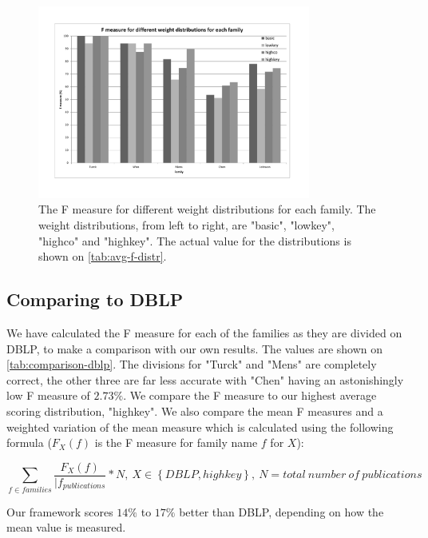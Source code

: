 \begin{figure}[htb]
	\centering
		\includegraphics[width=0.80\textwidth]{./fig/test-weights.pdf}
	\caption{The F measure for different weight distributions for each family. The weight distributions, from left to right, are "basic", "lowkey", "highco" and "highkey". The actual value for the distributions is shown on \autoref{tab:avg-f-distr}.}
	\label{fig:test-weights}
\end{figure}

\subsection{Comparing to DBLP}

We have calculated the F measure for each of the families as they are divided on DBLP, to make a comparison with our own results. The values are shown on \autoref{tab:comparison-dblp}. The divisions for "Turck" and "Mens" are completely correct, the other three are far less accurate with "Chen" having an astonishingly low F measure of $2.73\%$. We compare the F measure to our highest average scoring distribution, "highkey". We also compare the mean F measures and a weighted variation of the mean measure which is calculated using the following formula ($F_X(f)$ is the F measure for family name $f$ for $X$):

	\[
	\sum_{f \in families}{\frac{F_{X}(f)}{|f_{publications}} * N},~X \in \left\{DBLP,highkey\right\},~N = total~number~of~publications
\]

Our framework scores $14\%$ to $17\%$ better than DBLP, depending on how the mean value is measured.

